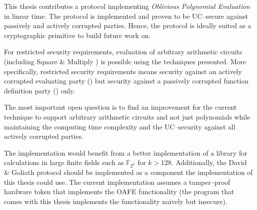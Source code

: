 \label{sec:conclusion}

This thesis contributes a protocol implementing \emph{Oblivious Polynomial
Evaluation} in linear time. The protocol is implemented and proven to be
UC--secure \cite{canetti01} against passively and actively corrupted parties.
Hence, the protocol is ideally suited as a cryptographic primitive to
build future work on.

For restricted security requirements, evaluation of arbitrary arithmetic
circuits (including Square \& Multiply \cite{knuth81}) is possible using the
techniques presented. More specifically, restricted security requirements means
security against an actively corrupted evaluating party (\JWpTwo{}) but security
against a passively corrupted function definition party (\JWpOne{}) only.


%
%
\label{sec:outlook}

The most important open question is to find an improvement for the current
technique to support arbitrary arithmetic circuits and not just polynomials
while maintaining the computing time complexity and the UC--security against all
actively corrupted parties.

The implementation would benefit from a better implementation of a library for
calculations in large finite fields such as $\mathbb{F}_{2^{k}}$ for $k > 128$.
Additionally, the David \& Goliath protocol \cite{davidgoliath} should be
implemented as a component the implementation of this thesis could use. The
current implementation assumes a tamper--proof hardware token that implements
the OAFE functionality (the program \JWBtoken{} that comes with this thesis
implements the functionality naively but insecure).

